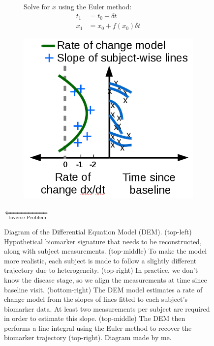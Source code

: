 \begin{figure}[h]
\begin{subfigure}{0.3\textwidth}
  Solve for $x$ using the Euler method:
  \begin{align*}
  t_1 &= t_0 + \delta t \\
  x_1 &= x_0 + f(x_0) \delta t \label{eq:dem3}
  \end{align*}
 \end{subfigure}
 \begin{subfigure}{0.3\textwidth}
     \centering
     \includegraphics[width=\textwidth]{images/demNewFigs/fig4}
     \vspace{1em}
 \end{subfigure}
 \vspace{-2em}
 \par{\huge $\xLeftarrow[\text{Inverse Problem}]{}$}
 
 \caption[Diagram of the Differential Equation Model (DEM)]{Diagram of the Differential Equation Model (DEM). (top-left) Hypothetical biomarker signature that needs to be reconstructed, along with subject measurements. (top-middle) To make the model more realistic, each subject is made to follow a slightly different trajectory due to heterogeneity. (top-right) In practice, we don't know the disease stage, so we align the measurements at time since baseline visit. (bottom-right) The DEM model estimates a rate of change model from the slopes of lines fitted to each subject's biomarker data. At least two measurements per subject are required in order to estimate this slope. (top-middle) The DEM then performs a line integral using the Euler method to recover the biomarker trajectory (top-right).  Diagram made by me.}
\label{fig:bckDEM}
\end{figure}

